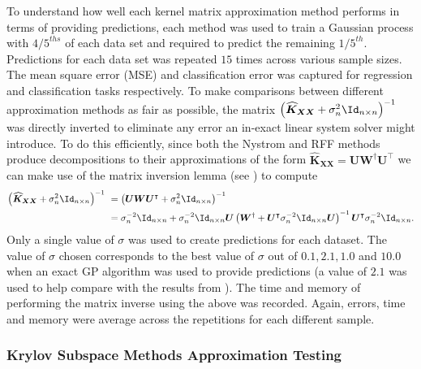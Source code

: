 To understand how well each kernel matrix approximation method performs in terms of providing predictions, each method was used to train a Gaussian process with ${4/5}^{ths}$ of each data set and required to predict the remaining ${1/5}^{th}$. Predictions for each data set was repeated $15$ times across various sample sizes. The mean square error (MSE) and classification error was captured for regression and classification tasks respectively. To make comparisons between different approximation methods as fair as possible, the matrix $\left( \widehat{\bm{K}}_{\bm{XX}} + \sigma_n^2 \Id_{n \times n} \right)^{-1}$ was directly inverted to eliminate any error an in-exact linear system solver might introduce. To do this efficiently, since both the Nystrom and RFF methods produce decompositions to their approximations of the form $\widehat{\bm{K}}_{\bm{XX}} = \bm{U} \bm{W}^{\dagger} \bm{U}^{\intercal}$ we can make use of the matrix inversion lemma (see ) to compute
\begin{align*}
    \left( \widehat{\bm{K}}_{\bm{XX}} + \sigma_n^2 \Id_{n \times n} \right)^{-1} \
     & = \left( \bm{U} \bm{W} \bm{U}^{\intercal} + \sigma_n^2 \Id_{n \times n} \right)^{-1}                                                                                                                                        \\
     & = \sigma_n^{-2} \Id_{n \times n} + \sigma_n^{-2} \Id_{n \times n} \bm{U} \left( \bm{W}^{\dagger} + \bm{U}^{\intercal} \sigma_n^{-2} \Id_{n \times n} \bm{U} \right)^{-1} \bm{U}^{\intercal} \sigma_n^{-2} \Id_{n \times n}.
\end{align*}
Only a single value of $\sigma$ was used to create predictions for each dataset. The value of $\sigma$ chosen corresponds to the best value of $\sigma$ out of $0.1,2.1,1.0$ and $10.0$ when an exact GP algorithm was used to provide predictions (a value of $2.1$ was used to help compare with the results from \cite{JMLR:v6:drineas05a}). The time and memory of performing the matrix inverse using the above was recorded. Again, errors, time and memory were average across the repetitions for each different sample.

\subsubsection{Krylov Subspace Methods Approximation Testing}\label{Section5.2.2}

